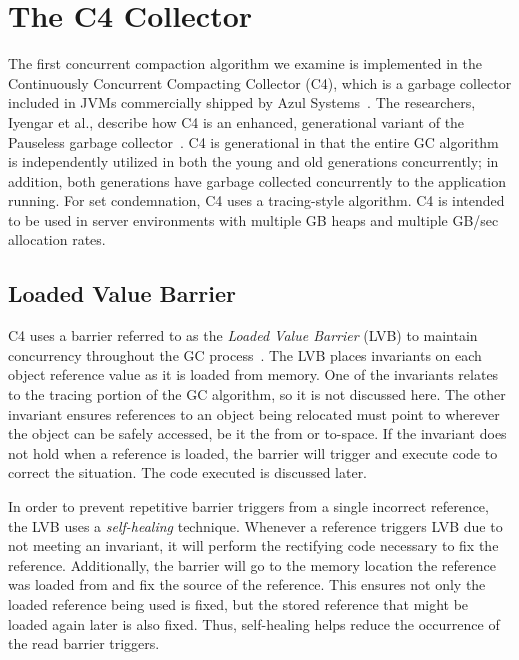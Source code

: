 \documentclass{sig-alternate}
\begin{document}
\section{The C4 Collector}
\label{sec:c4}

The first concurrent compaction algorithm we examine is implemented in the 
Continuously Concurrent Compacting Collector (C4), which is a garbage collector 
included in JVMs commercially shipped by Azul Systems~\cite{Tene:C4}. The 
researchers, Iyengar et al., describe how C4 is an enhanced, generational variant
of the Pauseless garbage collector~\cite{Click:Pauseless}. C4 is generational in 
that the entire GC algorithm is independently utilized in both the young and old generations 
concurrently; in addition, both generations have garbage collected concurrently 
to the application running. For set condemnation, C4 uses a tracing-style algorithm.
C4 is intended to be used in server environments with multiple GB heaps and 
multiple GB/sec allocation rates.


\subsection{Loaded Value Barrier}
\label{sec:c4LVB}

C4 uses a barrier referred to as the \emph{Loaded Value Barrier} (LVB) to 
maintain concurrency throughout the GC process~\cite{Tene:C4}. The LVB 
places invariants on each object reference value as it is loaded from memory.
One of the invariants relates to the tracing portion of the GC algorithm, so
it is not discussed here. The other invariant ensures
references to an object being relocated must point 
to wherever the object can be safely accessed, be it the from or to-space.
If the invariant does not hold
when a reference is loaded, the barrier will trigger and execute code to correct
the situation. The code executed is discussed later.

In order to prevent repetitive barrier triggers from a single incorrect reference,
the LVB uses a \emph{self-healing} technique. Whenever a reference triggers LVB
due to not meeting an invariant, it will perform the rectifying code
necessary to fix the reference. Additionally, the barrier will go to the memory
location the reference was loaded from and fix the source of the reference. This
ensures not only the loaded reference being used is fixed, but the stored reference
that might be loaded again later is also fixed.
Thus, self-healing helps reduce the occurrence of the read barrier triggers.
\end{document}
